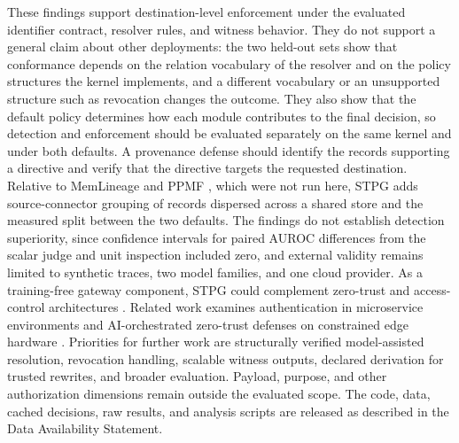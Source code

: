 \documentclass[applsci,article,submit,moreauthors]{Definitions/mdpi}
\begin{document}
These findings support destination-level enforcement under the evaluated identifier contract, resolver rules, and witness behavior. They do not support a general claim about other deployments: the two held-out sets show that conformance depends on the relation vocabulary of the resolver and on the policy structures the kernel implements, and a different vocabulary or an unsupported structure such as revocation changes the outcome. They also show that the default policy determines how each module contributes to the final decision, so detection and enforcement should be evaluated separately on the same kernel and under both defaults. A provenance defense should identify the records supporting a directive and verify that the directive targets the requested destination. Relative to MemLineage and PPMF \cite{ouyang2026memlineage,xu2026ppmf}, which were not run here, STPG adds source-connector grouping of records dispersed across a shared store and the measured split between the two defaults. The findings do not establish detection superiority, since confidence intervals for paired AUROC differences from the scalar judge and unit inspection included zero, and external validity remains limited to synthetic traces, two model families, and one cloud provider. As a training-free gateway component, STPG could complement zero-trust and access-control architectures \cite{syed2022zta,nist2020zta}. Related work examines authentication in microservice environments \cite{microsvc2025} and AI-orchestrated zero-trust defenses on constrained edge hardware \cite{edgezt2026}. Priorities for further work are structurally verified model-assisted resolution, revocation handling, scalable witness outputs, declared derivation for trusted rewrites, and broader evaluation. Payload, purpose, and other authorization dimensions remain outside the evaluated scope. The code, data, cached decisions, raw results, and analysis scripts are released as described in the Data Availability Statement.
\end{document}
